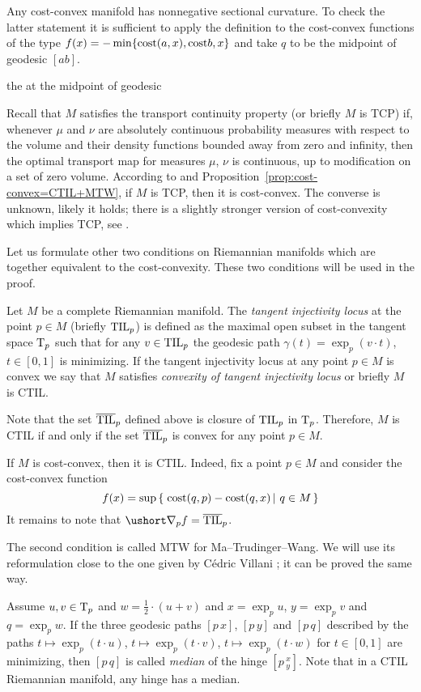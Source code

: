 Any cost-convex manifold has nonnegative sectional curvature.
To check the latter statement it is sufficient to apply the definition to the cost-convex functions of the type $f(x)=-\min\{\text{\rm cost}(a,x),\text{\rm cost}{b,x}\}$ and take $q$ to be the midpoint of geodesic $[ab]$.

the at the midpoint of geodesic  

Recall that $M$ satisfies the transport continuity property (or briefly $M$ is 
TCP) if, whenever $\mu$ and $\nu$ are absolutely continuous probability measures with respect
to the volume and their density functions bounded away from zero and infinity, then the optimal transport map for measures $\mu$, $\nu$ is continuous, up to modification
on a set of zero volume.
According to \cite{FRV-Nec+Suf} and Proposition~\ref{prop:cost-convex=CTIL+MTW}, if $M$ is TCP, then it is cost-convex.
The converse is unknown, likely it holds;
there is a slightly stronger version of cost-convexity which implies TCP, see \cite{FRV-Nec+Suf}.

Let us formulate other two conditions on Riemannian manifolds which are together equivalent to the cost-convexity.
These two conditions will be used in the proof.

Let $M$ be a complete Riemannian manifold.
The \emph{tangent injectivity locus} at the point $p\in M$ (briefly $\mathrm{\rm TIL}_p$) is defined as the maximal open subset in the tangent space $\mathrm{T}_p$ such that for any $v\in\mathrm{\rm TIL}_p$ the geodesic path $\gamma(t)=\exp_p(v\cdot t)$, $t\in [0,1]$ is minimizing.
If the tangent injectivity locus at any point $p\in M$ is convex we say that $M$ satisfies \emph{convexity of  tangent injectivity locus} or briefly $M$ is CTIL.

Note that the set $\overline{\mathrm{\rm TIL}}_p$ defined above is closure of $\mathrm{\rm TIL}_p$ in $\mathrm{T}_p$.
Therefore, $M$ is CTIL if and only if the set $\overline{\mathrm{\rm TIL}}_p$ is convex for any point $p\in M$.

If $M$ is cost-convex, then it is CTIL.
Indeed, fix a point $p\in M$ and consider the cost-convex function 
\[f(x)=\sup \set{\cost(q,p)-\cost(q,x)}{q\in M}\]
It remains to note that $\ushort\nabla_pf=\overline{\TIL}_p$.

The second condition is called MTW for Ma--Trudinger--Wang.
We will use its reformulation close to the one given by Cédric Villani \cite[2.6]{MTW+CTIL}; it can be proved the same way.

Assume $u,v\in \mathrm{T}_p$ and $w=\tfrac12\cdot(u+v)$
and $x=\exp_p u$, $y=\exp_pv$ and $q=\exp_pw$.
If the three geodesic paths $[p\,x]$, $[p\,y]$ and $[p\,q]$ described by the paths 
$t\mapsto\exp_p(t\cdot u)$,  $t\mapsto\exp_p(t\cdot v)$, $t\mapsto\exp_p(t\cdot w)$ for $t\in[0,1]$ are minimizing, then $[p\,q]$ is called \emph{median} of the hinge $[p\,^x_y]$.
Note that in a CTIL Riemannian manifold, any hinge has a median.

